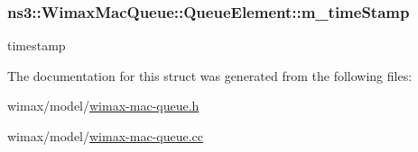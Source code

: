 \subsubsection[{\texorpdfstring{m\+\_\+time\+Stamp}{m_timeStamp}}]{ ns3\+::\+Wimax\+Mac\+Queue\+::\+Queue\+Element\+::m\+\_\+time\+Stamp}\hypertarget{structns3_1_1WimaxMacQueue_1_1QueueElement_a9bb3a65aa930da2e2972818880d03954}{}\label{structns3_1_1WimaxMacQueue_1_1QueueElement_a9bb3a65aa930da2e2972818880d03954}


timestamp 



The documentation for this struct was generated from the following files\+:\begin{DoxyCompactItemize}
\item 
wimax/model/\hyperlink{wimax-mac-queue_8h}{wimax-\/mac-\/queue.\+h}\item 
wimax/model/\hyperlink{wimax-mac-queue_8cc}{wimax-\/mac-\/queue.\+cc}\end{DoxyCompactItemize}
